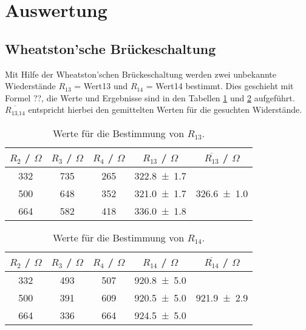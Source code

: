 \section{Auswertung}
\label{sec:Auswertung}

\subsection{Wheatston'sche Brückeschaltung}
Mit Hilfe der Wheatston'schen Brückeschaltung werden zwei unbekannte Wiederstände $R_{13}$ = Wert13 und $R_{14}$ = Wert14 bestimmt. Dies geschieht mit Formel ??, die Werte und Ergebnisse sind in den Tabellen \ref{tab:Wheat1} und \ref{tab:Wheat2} aufgeführt. $\overline{R_\text{13,14}}$ entspricht hierbei den gemittelten Werten für die gesuchten Widerstände.
\begin{table}[H]
  \centering
  \begin{tabular}{c c c c c}
    \toprule
    $R_2$ / $\Omega$ & $R_3$ / $\Omega$ & $R_4$ / $\Omega$ & $R_{13}$ / $\Omega$ & $\overline{R_{13}}$ / $\Omega$ \\
    \midrule
    332 & 735 & 265 & \num{322.8 +- 1.7} &  \\
    500 & 648 & 352 & \num{321.0 +- 1.7} &  \num{326.6 +- 1.0}\\
    664 & 582 & 418 & \num{336.0 +- 1.8} &  \\
  \end{tabular}
  \caption{Werte für die Bestimmung von $R_{13}$.}
  \label{tab:Wheat1}
\end{table}

\begin{table}[H]
  \centering
  \begin{tabular}{c c c c c}
    \toprule
    $R_2$ / $\Omega$ & $R_3$ / $\Omega$ & $R_4$ / $\Omega$ & $R_{14}$ / $\Omega$ & $\overline{R_{14}}$ / $\Omega$ \\
    \midrule
    332 & 493 & 507 & \num{920.8 +- 5.0} &  \\
    500 & 391 & 609 & \num{920.5 +- 5.0} &  \num{921.9 +- 2.9}\\
    664 & 336 & 664 & \num{924.5 +- 5.0} &  \\
  \end{tabular}
  \caption{Werte für die Bestimmung von $R_{14}$.}
  \label{tab:Wheat2}
\end{table}

